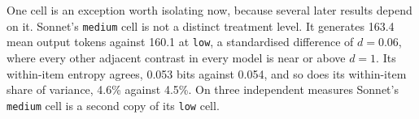 \label{sec:sonnetmedium}\label{app:sonnetmedium}
One cell is an exception worth isolating now, because several later results
depend on it. Sonnet's \texttt{medium} cell is not a distinct treatment
level. It generates 163.4 mean output tokens against 160.1 at \texttt{low}, a
standardised difference of $d = 0.06$, where every other adjacent contrast in
every model is near or above $d = 1$. Its within-item entropy agrees, 0.053
bits against 0.054, and so does its within-item share of variance, 4.6\%
against 4.5\%. On three independent measures Sonnet's \texttt{medium} cell is
a second copy of its \texttt{low} cell.

